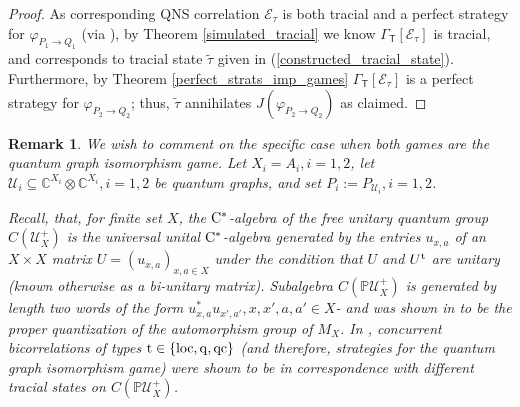 \documentclass[11pt]{amsart}
\newtheorem{remark}[theorem]{Remark}
\newcommand{\cl}[1]{\mathcal{#1}}
\newcommand{\bb}[1]{\mathbb{#1}}
\begin{document}
\begin{proof}
As corresponding QNS correlation $\cl{E}_{\tau}$ is both tracial and a perfect strategy for $\varphi_{P_{1}\rightarrow Q_{1}}$ (via \cite[Corollary 4.4]{synch_bhtt}), by Theorem \ref{simulated_tracial} we know $\Gamma_{\mathsf{T}}[\cl{E}_{\tau}]$ is tracial, and corresponds to tracial state $\tilde{\tau}$ given in (\ref{constructed_tracial_state}). Furthermore, by Theorem \ref{perfect_strats_imp_games} $\Gamma_{\mathsf{T}}[\cl{E}_{\tau}]$ is a perfect strategy for $\varphi_{P_{2}\rightarrow Q_{2}}$; thus, $\tilde{\tau}$ annihilates $J(\varphi_{P_{2}\rightarrow Q_{2}})$ as claimed. 
\end{proof}

\begin{remark}
\rm We wish to comment on the specific case when both games are the quantum graph isomorphism game. Let $X_{i} = A_{i}, i = 1, 2$, let $\cl{U}_{i} \subseteq \bb{C}^{X_{i}}\otimes \bb{C}^{X_{i}}, i = 1, 2$ be quantum graphs, and set $P_{i} := P_{\cl{U}_{i}}, i = 1, 2$. 

Recall, that, for finite set $X$, the ${\rm C}^{*}$-algebra of the free unitary quantum group $C(\cl{U}_{X}^{+})$ is the universal unital ${\rm C}^{*}$-algebra generated by the entries $u_{x, a}$ of an $X\times X$ matrix $U = (u_{x, a})_{x, a \in X}$ under the condition that $U$ and $U^{\rm t}$ are unitary (known otherwise as a bi-unitary matrix). Subalgebra $C(\bb{P}\cl{U}_{X}^{+})$ is generated by length two words of the form $u_{x, a}^{*}u_{x', a'}, x, x', a, a' \in X$- and was shown in \cite[Corollary 4.1]{banica} to be the proper quantization of the automorphism group of $M_{X}$. In \cite[Theorem 6.7]{bhtt}, concurrent bicorrelations of types ${\rm t}\in \{\rm loc, q, qc\}$ (and therefore, strategies for the quantum graph isomorphism game) were shown to be in correspondence with different tracial states on $C(\bb{P}\cl{U}_{X}^{+})$.


\end{remark}
\end{document}
